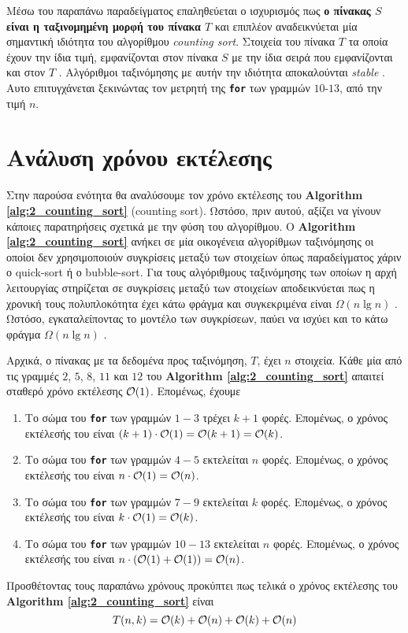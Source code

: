 	\begin{center}
		
	\end{center}

	Μέσω του παραπάνω παραδείγματος επαληθεύεται ο ισχυρισμός πως \textbf{ο πίνακας $S$ είναι η ταξινομημένη μορφή του πίνακα $T$} και επιπλέον αναδεικνύεται μία σημαντική ιδιότητα του αλγορίθμου \textsl{counting sort}. Στοιχεία του πίνακα $T$ τα οποία έχουν την ίδια τιμή, εμφανίζονται στον πίνακα $S$ με την ίδια σειρά που εμφανίζονται και στον $T$ . Αλγόριθμοι ταξινόμησης με αυτήν την ιδιότητα αποκαλούνται \textsl{stable} . Αυτο επιτυγχάνεται ξεκινώντας τον μετρητή της \texttt{\textbf{for}} των γραμμών $10$-$13$, από την τιμή $n$.

\section{Ανάλυση χρόνου εκτέλεσης}

	Στην παρούσα ενότητα θα αναλύσουμε τον χρόνο εκτέλεσης του \textbf{Algorithm \ref{alg:2_counting_sort}} (counting sort). Ωστόσο, πριν αυτού, αξίζει να γίνουν κάποιες παρατηρήσεις σχετικά με την φύση του αλγορίθμου. Ο \textbf{Algorithm \ref{alg:2_counting_sort}} ανήκει σε μία οικογένεια αλγορίθμων ταξινόμησης οι οποίοι δεν χρησιμοποιούν συγκρίσεις μεταξύ των στοιχείων όπως παραδείγματος χάριν ο quick-sort ή ο bubble-sort. Για τους αλγόριθμους ταξινόμησης των οποίων η αρχή λειτουργίας στηρίζεται σε συγκρίσεις μεταξύ των στοιχείων αποδεικνύεται πως η χρονική τους πολυπλοκότητα έχει κάτω φράγμα και συγκεκριμένα είναι $\Omega(n\lg{n})$ . Ωστόσο, εγκαταλείποντας το μοντέλο των συγκρίσεων, παύει να ισχύει και το κάτω φράγμα $\Omega(n\lg{n})$ .\par
	Αρχικά, ο πίνακας με τα δεδομένα προς ταξινόμηση, $T$, έχει $n$ στοιχεία. Κάθε μία από τις γραμμές $2$, $5$, $8$, $11$ και $12$ του \textbf{Algorithm \ref{alg:2_counting_sort}} απαιτεί σταθερό χρόνο εκτέλεσης $\mathcal{O}(1)$. Επομένως, έχουμε
	\begin{enumerate}[label=\roman*.]
		\item Το σώμα του \texttt{\textbf{for}} των γραμμών $1-3$ τρέχει $k+1$ φορές. Επομένως, ο χρόνος εκτέλεσής του είναι $(k+1)\cdot\mathcal{O}(1)=\mathcal{O}(k+1)=\mathcal{O}(k)$.
		\item Το σώμα του \texttt{\textbf{for}} των γραμμών $4-5$ εκτελείται $n$ φορές. Επομένως, ο χρόνος εκτέλεσής του είναι $n\cdot\mathcal{O}(1)=\mathcal{O}(n)$.
		\item Το σώμα του \texttt{\textbf{for}} των γραμμών $7-9$ εκτελείται $k$ φορές. Επομένως, ο χρόνος εκτέλεσής του είναι $k\cdot\mathcal{O}(1)=\mathcal{O}(k)$.
		\item Το σώμα του \texttt{\textbf{for}} των γραμμών $10-13$ εκτελείται $n$ φορές. Επομένως, ο χρόνος εκτέλεσής του είναι $n\cdot(\mathcal{O}(1)+\mathcal{O}(1))=\mathcal{O}(n)$.
	\end{enumerate}
 Προσθέτοντας τους παραπάνω χρόνους προκύπτει πως τελικά ο χρόνος εκτέλεσης του \textbf{Algorithm \ref{alg:2_counting_sort}} είναι
\begin{equation*}
	T(n,k)=\mathcal{O}(k)+\mathcal{O}(n)+\mathcal{O}(k)+\mathcal{O}(n)
\end{equation*}

